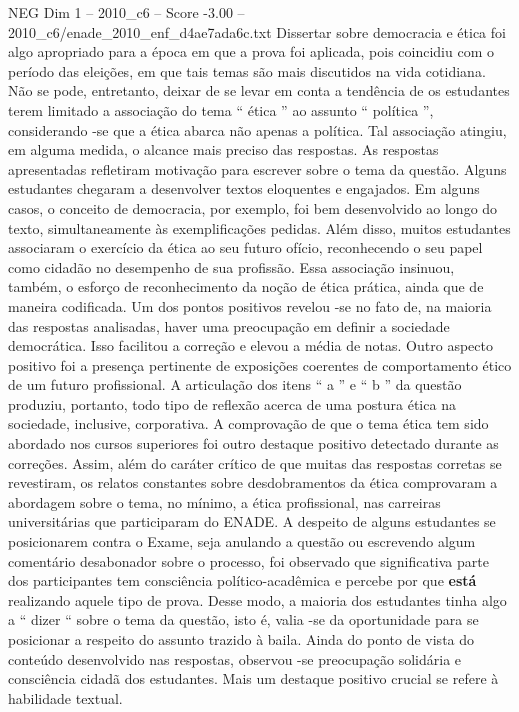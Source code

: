 \begin{textsample}{NEG Dim 1 – 2010\_c6 – Score -3.00 – 2010\_c6/enade\_2010\_enf\_d4ae7ada6c.txt}
Dissertar sobre democracia e ética foi algo apropriado para a época em que a prova foi aplicada, pois coincidiu com o período das eleições, em que tais temas são mais discutidos na vida cotidiana.
Não se pode, entretanto, deixar de se levar em conta a tendência de os estudantes terem limitado a associação do tema “ ética ” ao assunto “ política ”, considerando -se que a ética abarca não apenas a política.
Tal associação atingiu, em alguma medida, o alcance mais preciso das respostas.
As respostas apresentadas refletiram motivação para escrever sobre o tema da questão.
Alguns estudantes chegaram a desenvolver textos eloquentes e engajados.
Em alguns casos, o conceito de democracia, por exemplo, foi bem desenvolvido ao longo do texto, simultaneamente às exemplificações pedidas.
Além disso, muitos estudantes associaram o exercício da ética ao seu futuro ofício, reconhecendo o seu papel como cidadão no desempenho de sua profissão.
Essa associação insinuou, também, o esforço de reconhecimento da noção de ética prática, ainda que de maneira codificada.
Um dos pontos positivos revelou -se no fato de, na maioria das respostas analisadas, haver uma preocupação em definir a sociedade democrática.
Isso facilitou a correção e elevou a média de notas.
Outro aspecto positivo foi a presença pertinente de exposições coerentes de comportamento ético de um futuro profissional.
A articulação dos itens “ a ” e “ b ” da questão produziu, portanto, todo tipo de reflexão acerca de uma postura ética na sociedade, inclusive, corporativa.
A comprovação de que o tema ética tem sido abordado nos cursos superiores foi outro destaque positivo detectado durante as correções.
Assim, além do caráter crítico de que muitas das respostas corretas se revestiram, os relatos constantes sobre desdobramentos da ética comprovaram a abordagem sobre o tema, no mínimo, a ética profissional, nas carreiras universitárias que participaram do ENADE.
A despeito de alguns estudantes se posicionarem contra o Exame, seja anulando a questão ou escrevendo algum comentário desabonador sobre o processo, foi observado que significativa parte dos participantes tem consciência político-acadêmica e percebe por que \textbf{está} realizando aquele tipo de prova.
Desse modo, a maioria dos estudantes tinha algo a “ dizer “ sobre o tema da questão, isto é, valia -se da oportunidade para se posicionar a respeito do assunto trazido à baila.
Ainda do ponto de vista do conteúdo desenvolvido nas respostas, observou -se preocupação solidária e consciência cidadã dos estudantes.
Mais um destaque positivo crucial se refere à habilidade textual.

\end{textsample}
